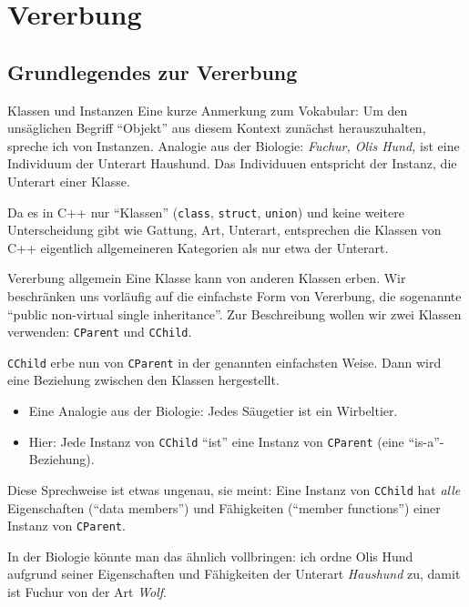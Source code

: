 \section{Vererbung}

\subsection{Grundlegendes zur Vererbung}

\begin{frame}[fragile]{Klassen und Instanzen}
	Eine kurze Anmerkung zum Vokabular: Um den unsäglichen Begriff \enquote{Objekt} aus diesem Kontext zunächst herauszuhalten, spreche ich von Instanzen. Analogie aus der Biologie: \emph{Fuchur, Olis Hund,} ist eine Individuum der Unterart Haushund. Das Individuuen entspricht der Instanz, die Unterart einer Klasse.
	
	\vspace{1em}
	
	Da es in C++ nur \enquote{Klassen} (\verb|class|, \verb|struct|, \verb|union|) und keine weitere Unterscheidung gibt wie Gattung, Art, Unterart, entsprechen die Klassen von C++ eigentlich allgemeineren Kategorien als nur etwa der Unterart.
\end{frame}

\begin{frame}[fragile]{Vererbung allgemein}
	Eine Klasse kann von anderen Klassen erben. Wir beschränken uns vorläufig auf die einfachste Form von Vererbung, die sogenannte \enquote{public non-virtual single inheritance}. Zur Beschreibung wollen wir zwei Klassen verwenden: \verb|CParent| und \verb|CChild|.
	
	\pause
	
	\verb|CChild| erbe nun von \verb|CParent| in der genannten einfachsten Weise. Dann wird eine Beziehung zwischen den Klassen hergestellt.
	\begin{itemize}
		\item Eine Analogie aus der Biologie: Jedes Säugetier ist ein Wirbeltier.
		\item Hier: Jede Instanz von \verb|CChild| \enquote{ist} eine Instanz von \verb|CParent| (eine \enquote{is-a}-Beziehung).
	\end{itemize}
	
	\pause
	
	\small
	Diese Sprechweise ist etwas ungenau, sie meint: Eine Instanz von \verb|CChild| hat \emph{alle} Eigenschaften (\enquote{data members}) und Fähigkeiten (\enquote{member functions}) einer Instanz von \verb|CParent|.
	
	In der Biologie könnte man das ähnlich vollbringen: ich ordne Olis Hund aufgrund seiner Eigenschaften und Fähigkeiten der Unterart \emph{Haushund} zu, damit ist Fuchur von der Art \emph{Wolf}.
\end{frame}


